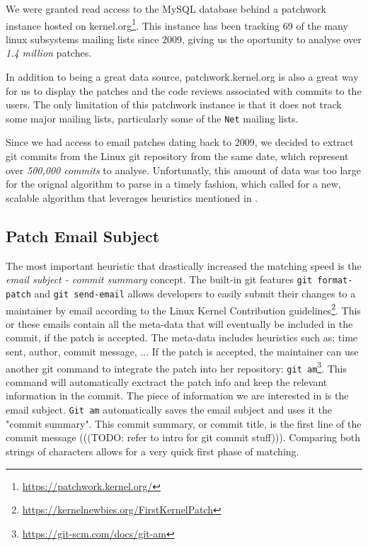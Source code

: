 We were granted read access to the MySQL database behind a patchwork instance hosted on kernel.org\footnote{\url{https://patchwork.kernel.org/}}. This instance has been tracking 69 of the many linux subsystems mailing lists since 2009, giving us the oportunity to analyse over \textit{1.4 million} patches.

In addition to being a great data source, patchwork.kernel.org is also a great way for us to display the patches and the code reviews associated with commits to the users. The only limitation of this patchwork instance is that it does not track some major mailing lists, particularly some of the \texttt{Net} mailing lists. 


Since we had access to email patches dating back to 2009, we decided to extract git commits from the Linux git repository from the same date, which represent over \textit{500,000 commits} to analyse. Unfortunatly, this amount of data was too large for the orignal algorithm to parse in a timely fashion, which called for a new, scalable algorithm that leverages heuristics mentioned in \citep{msr13jojo,jiang14}.

\subsection{Patch Email Subject}

The most important heuristic that drastically increased the matching speed is the \textit{email subject - commit summary} concept. The built-in git features \texttt{git format-patch} and \texttt{git send-email} allows developers to easily submit their changes to a maintainer by email according to the Linux Kernel Contribution guidelines\footnote{\url{https://kernelnewbies.org/FirstKernelPatch}}. This or these emails contain all the meta-data that will eventually be included in the commit, if the patch is accepted. The meta-data includes heuristics such as: time sent, author, commit message, ... If the patch is accepted, the maintainer can use another git command to integrate the patch into her repository: \texttt{git am}\footnote{\url{https://git-scm.com/docs/git-am}}. This command will automatically exctract the patch info and keep the relevant information in the commit. The piece of information we are interested in is the email subject. \texttt{Git am} automatically saves the email subject and uses it the "commit summary". This commit summary, or commit title, is the first line of the commit message (((TODO: refer to intro for git commit stuff))). Comparing both strings of characters allows for a very quick first phase of matching.

